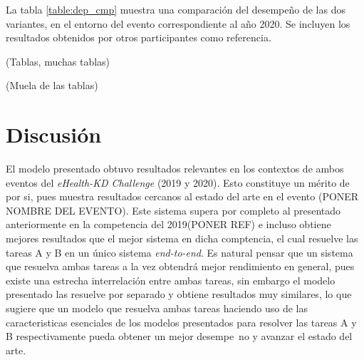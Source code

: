 La tabla \ref{table:dep_cmp} muestra una comparación del desempeño de las dos variantes, en el entorno del evento correspondiente al año 2020. Se incluyen los resultados obtenidos por otros participantes como referencia.

(Tablas, muchas tablas)

(Muela de las tablas)


\section{Discusión}
El modelo presentado obtuvo resultados relevantes en los contextos de ambos eventos del \emph{eHealth-KD Challenge} (2019 y 2020). Esto constituye un m\'erito de por si, pues muestra resultados cercanos al estado del arte en el evento (PONER NOMBRE DEL EVENTO). Este sistema supera por completo al presentado anteriormente en la competencia del 2019(PONER REF) e incluso obtiene mejores resultados que el mejor sistema en dicha comptencia, el cual resuelve las tareas A y B en un \'unico sistema \emph{end-to-end}. Es natural pensar que un sistema que resuelva ambas tareas a la vez obtendr\'a mejor rendimiento en general, pues existe una estrecha interrelaci\'on entre ambas tareas, sin embargo el modelo presentado las resuelve por separado y obtiene resultados muy similares, lo que sugiere que un modelo que resuelva ambas tareas haciendo uso de las caracteristicas esenciales de los modelos presentados para resolver las tareas A y B respectivamente pueda obtener un mejor desempe~no y avanzar el estado del arte.

